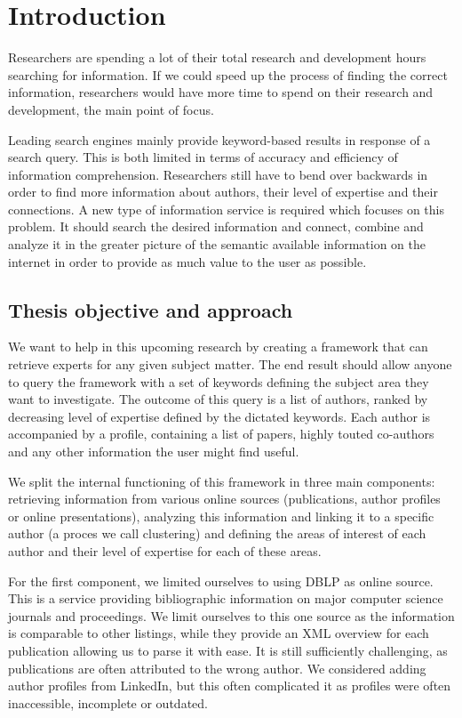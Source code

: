 \chapter{Introduction}

Researchers are spending a lot of their total research and development hours searching for information. If we could speed up the process of finding the correct information, researchers would have more time to spend on their research and development, the main point of focus.

Leading search engines mainly provide keyword-based results in response of a search query. This is both limited in terms of accuracy and efficiency of information comprehension. Researchers still have to bend over backwards in order to find more information about authors, their level of expertise and their connections. A new type of information service is required which focuses on this problem. It should search the desired information and connect, combine and analyze it in the greater picture of the semantic available information on the internet in order to provide as much value to the user as possible.


\section{Thesis objective and approach}

We want to help in this upcoming research by creating a framework that can retrieve experts for any given subject matter. The end result should allow anyone to query the framework with a set of keywords defining the subject area they want to investigate. The outcome of this query is a list of authors, ranked by decreasing level of expertise defined by the dictated keywords. Each author is accompanied by a profile, containing a list of papers, highly touted co-authors and any other information the user might find useful.

We split the internal functioning of this framework in three main components: retrieving information from various online sources (publications, author profiles or online presentations), analyzing this information and linking it to a specific author (a proces we call clustering) and defining the areas of interest of each author and their level of expertise for each of these areas.

For the first component, we limited ourselves to using DBLP \cite{dblp} as online source. This is a service providing bibliographic information on major computer science journals and proceedings. We limit ourselves to this one source as the information is comparable to other listings, while they provide an XML overview for each publication allowing us to parse it with ease. It is still sufficiently challenging, as publications are often attributed to the wrong author. We considered adding author profiles from LinkedIn, but this often complicated it as profiles were often inaccessible, incomplete or outdated.

